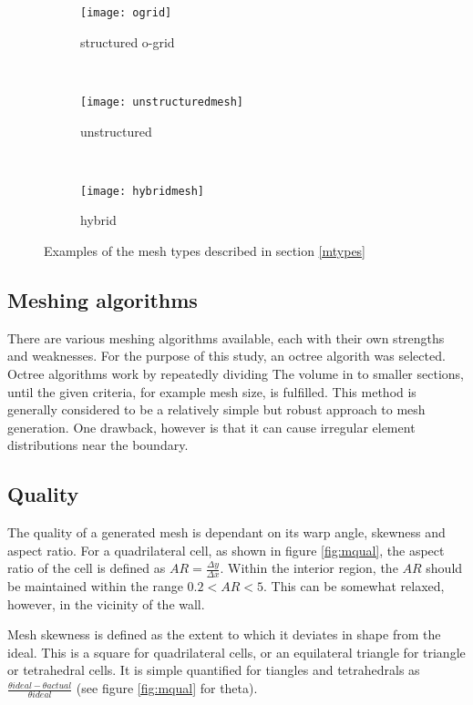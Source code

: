 \begin{figure}
  \begin{subfigure}[t]{0.3\textwidth}
    \texttt{[image: ogrid]}
      \caption{structured o-grid}
    \label{strucmesh}
  \end{subfigure}%
  ~%
  \begin{subfigure}[t]{0.3\textwidth}
    \texttt{[image: unstructuredmesh]}
    \caption{unstructured}
    \label{unstrucmesh}
  \end{subfigure}%
  ~%
  \begin{subfigure}[t]{0.3\textwidth}
    \texttt{[image: hybridmesh]}
    \caption{hybrid}
    \label{unstrucmesh}
  \end{subfigure}

  \caption{Examples of the mesh types described in section \ref{mtypes}} 
  \label{fig:struct}
\end{figure}

\subsection{Meshing algorithms}
There are various meshing algorithms available, each with their own strengths and weaknesses. For the purpose of this study, an octree algorith was selected. Octree algorithms work by repeatedly dividing The volume in to smaller sections, until the given criteria, for example mesh size, is fulfilled. This method is generally considered to be a relatively simple but robust approach to mesh generation. One drawback, however is that it can cause irregular element distributions near the boundary.

\subsection{Quality}

The quality of a generated mesh is dependant on its warp angle, skewness and aspect ratio. For a quadrilateral cell, as shown in figure \ref{fig:mqual}, the aspect ratio of the cell is defined as $AR = \frac{\Delta y} {\Delta x}$. Within the interior region, the $AR$ should be maintained within the range $0.2 < AR < 5$. This can be somewhat relaxed, however, in the vicinity of the wall.

Mesh skewness is defined as the extent to which it deviates in shape from the ideal. This is a square for quadrilateral cells, or an equilateral triangle for triangle or tetrahedral cells. It is simple quantified for tiangles and tetrahedrals as $\frac{\theta ideal - \theta actual} {\theta ideal}$ (see figure \ref{fig:mqual} for theta).

